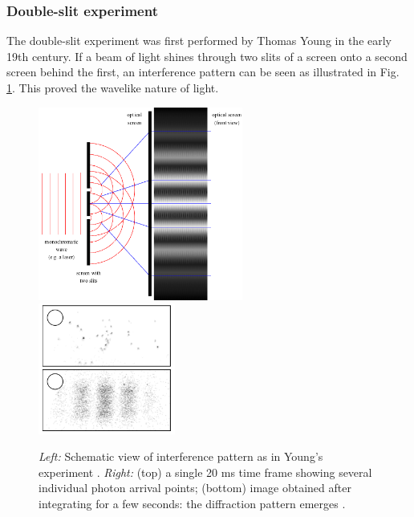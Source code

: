 \subsubsection{Double-slit experiment}
The double-slit experiment was first performed by Thomas Young in the early 19th century. If a beam of light shines through two slits of a screen onto a second screen behind the first, an interference pattern can be seen as illustrated in Fig. \ref{fig:doubleslit}. This proved the wavelike nature of light.

\begin{figure}
\includegraphics[width=0.6\textwidth,height=0.5\linewidth]{chapter1/img/younginterference.png}
\includegraphics[width=0.4\textwidth,height=0.5\linewidth]{chapter1/img/doubleslitsinglephoton_crop.png}
\caption{\textit{Left:} Schematic view of interference pattern as in Young's experiment \cite{shmoop}.  \textit{Right:} (top) a single 20 ms time frame showing several individual photon arrival points; (bottom) image obtained after integrating for a few seconds: the diffraction pattern emerges \cite{weiswynands:2003}. }
\label{fig:doubleslit}
\end{figure}

